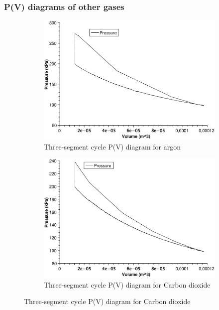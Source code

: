 \documentclass{scrartcl}
\begin{document}
\subsubsection{P(V) diagrams of other gases}
\begin{figure}[!ht]
     \centering
     \begin{subfigure}[b]{0.3\textwidth}
         \centering
         \includegraphics[width=\textwidth]{3seg/PV_argon_3.eps}
         \caption{Three-segment cycle P(V) diagram for argon}
         \label{fig:3seg_argon}
     \end{subfigure}
     \hfill
     \begin{subfigure}[b]{0.3\textwidth}
         \centering
         \includegraphics[width=\textwidth]{3seg/PV_CO2_3seg.eps}
         \caption{Three-segment cycle P(V) diagram for Carbon dioxide}
         \label{fig:3seg_CO2}

\end{subfigure}
\end{figure}
\end{document}
